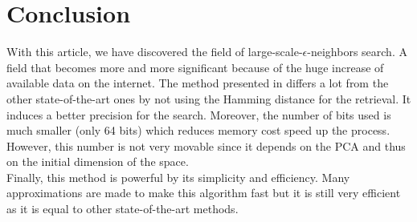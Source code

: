 \documentclass{article}
\begin{document}
\newpage

\section{Conclusion}

With this article, we have discovered the field of large-scale-$\epsilon$-neighbors search. A field that becomes more and more significant because of the huge increase of available data on the internet. The method presented in \citep{QSRank} differs a lot from the other state-of-the-art ones by not using the Hamming distance for the retrieval. It induces a better precision for the search. Moreover, the number of bits used is much smaller (only 64 bits) which reduces memory cost speed up the process. However, this number is not very movable since it depends on the PCA and thus on the initial dimension of the space.\\
Finally, this method is powerful by its simplicity and efficiency. Many approximations are made to make this algorithm fast but it is still very efficient as it is equal to other state-of-the-art methods.

\end{document}
